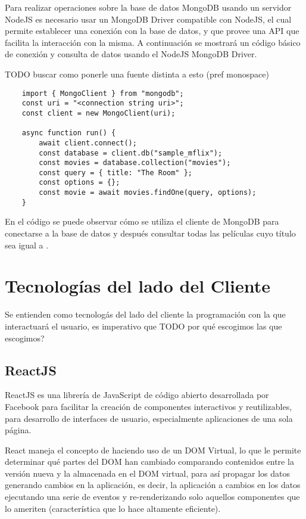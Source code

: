 Para realizar operaciones sobre la base de datos MongoDB usando un servidor NodeJS es necesario usar un MongoDB Driver compatible con NodeJS, el cual permite establecer una conexión con la base de datos, y que provee una API que facilita la interacción con la misma. A continuación se mostrará un código básico de conexión y consulta de datos usando el NodeJS MongoDB Driver.

TODO buscar como ponerle una fuente distinta a esto (pref monospace)
\begin{lstlisting}
    import { MongoClient } from "mongodb";
    const uri = "<connection string uri>";
    const client = new MongoClient(uri);

    async function run() {
        await client.connect();
        const database = client.db("sample_mflix");
        const movies = database.collection("movies");
        const query = { title: "The Room" };
        const options = {};
        const movie = await movies.findOne(query, options);
    }
\end{lstlisting}

En el código se puede observar cómo se utiliza el cliente de MongoDB para conectarse a la base de datos  y después consultar todas las películas cuyo título sea igual a .

\section{Tecnologías del lado del Cliente}

Se entienden como tecnologás del lado del cliente la programación con la que interactuará el usuario, es imperativo que 
TODO por qué escogimos las que escogimos?

\subsection{ReactJS}

ReactJS es una librería de JavaScript de código abierto desarrollada por Facebook para facilitar la creación de componentes interactivos y reutilizables, para desarrollo de interfaces de usuario, especialmente aplicaciones de una sola página.

React maneja el concepto de  \cite{ReactiveProgramming} haciendo uso de un DOM Virtual, lo que le permite determinar qué partes del DOM han cambiado comparando contenidos entre la versión nueva y la almacenada en el DOM virtual, para así propagar los datos generando cambios en la aplicación, es decir, la aplicación  a cambios en los datos ejecutando una serie de eventos y re-renderizando solo aquellos componentes que lo ameriten (característica que lo hace altamente eficiente). 

